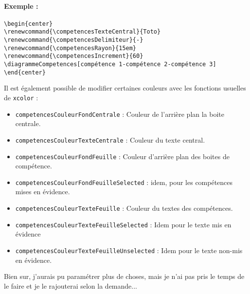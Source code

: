 \documentclass[a4paper,12pt]{article}
\begin{document}
			\paragraph{Exemple :}
			
			\begin{verbatim}
\begin{center}
\renewcommand{\competencesTexteCentral}{Toto}
\renewcommand{\competencesDelimiteur}{-}
\renewcommand{\competencesRayon}{15em}
\renewcommand{\competencesIncrement}{60}
\diagrammeCompetences[compétence 1-compétence 2-compétence 3]
\end{center}
			\end{verbatim}
		
			\begin{center}
				\renewcommand{\competencesTexteCentral}{Toto}
				\renewcommand{\competencesDelimiteur}{-}
				\renewcommand{\competencesRayon}{15em}
				\renewcommand{\competencesIncrement}{60}
			\end{center}
			
			
			Il est également possible de modifier certaines couleurs avec les fonctions usuelles de \verb!xcolor! :
			
			\begin{itemize}
				\item \verb!competencesCouleurFondCentrale! : Couleur de l'arrière plan la boite centrale.
				\item \verb!competencesCouleurTexteCentrale! : Couleur du texte central.
				\item \verb!competencesCouleurFondFeuille! : Couleur d'arrière plan des boites de compétence.
				\item \verb!competencesCouleurFondFeuilleSelected! : idem, pour les compétences mises en évidence.
				\item \verb!competencesCouleurTexteFeuille! : Couleur du textes des compétences.
				\item \verb!competencesCouleurTexteFeuilleSelected! : Idem pour le texte mis en évidence
				\item \verb!competencesCouleurTexteFeuilleUnselected! : Idem pour le texte non-mis en évidence.
			\end{itemize}

			Bien sur, j'aurais pu paramétrer plus de choses, mais je n'ai pas pris le temps de le faire et je le rajouterai selon la demande...
			
\end{document}
